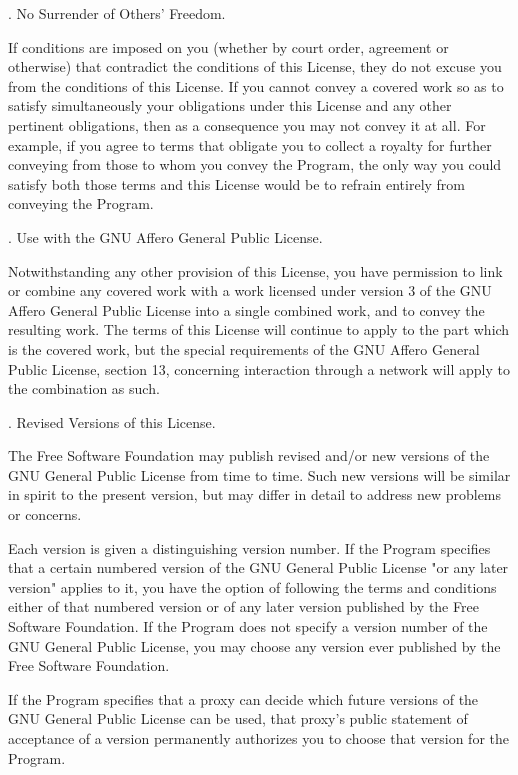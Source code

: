 . No Surrender of Others' Freedom.

If conditions are imposed on you (whether by court order, agreement or
otherwise) that contradict the conditions of this License, they do not
excuse you from the conditions of this License.  If you cannot convey a
covered work so as to satisfy simultaneously your obligations under this
License and any other pertinent obligations, then as a consequence you may
not convey it at all.  For example, if you agree to terms that obligate you
to collect a royalty for further conveying from those to whom you convey
the Program, the only way you could satisfy both those terms and this
License would be to refrain entirely from conveying the Program.

. Use with the GNU Affero General Public License.

Notwithstanding any other provision of this License, you have
permission to link or combine any covered work with a work licensed
under version 3 of the GNU Affero General Public License into a single
combined work, and to convey the resulting work.  The terms of this
License will continue to apply to the part which is the covered work,
but the special requirements of the GNU Affero General Public License,
section 13, concerning interaction through a network will apply to the
combination as such.

. Revised Versions of this License.

The Free Software Foundation may publish revised and/or new versions of
the GNU General Public License from time to time.  Such new versions will
be similar in spirit to the present version, but may differ in detail to
address new problems or concerns.

Each version is given a distinguishing version number.  If the
Program specifies that a certain numbered version of the GNU General
Public License "or any later version" applies to it, you have the
option of following the terms and conditions either of that numbered
version or of any later version published by the Free Software
Foundation.  If the Program does not specify a version number of the
GNU General Public License, you may choose any version ever published
by the Free Software Foundation.

If the Program specifies that a proxy can decide which future
versions of the GNU General Public License can be used, that proxy's
public statement of acceptance of a version permanently authorizes you
to choose that version for the Program.


